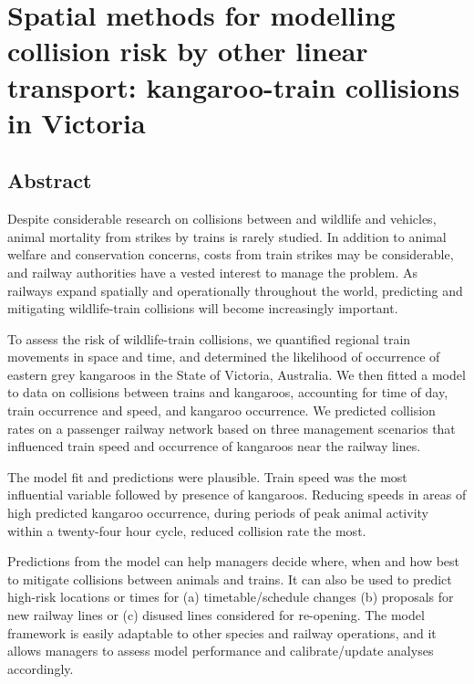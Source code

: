\chapter{Spatial methods for modelling collision risk by other linear transport: kangaroo-train collisions in Victoria}\label{sec:train}
\newpage

\begin{localsize}{10}
\section*{\centering Abstract}

Despite considerable research on collisions between and wildlife and vehicles, animal mortality from strikes by trains is rarely studied.  In addition to animal welfare and conservation concerns, costs from train strikes may be considerable, and railway authorities have a vested interest to manage the problem. As railways expand spatially and operationally throughout the world, predicting and mitigating wildlife-train collisions will become increasingly important.

To assess the risk of wildlife-train collisions, we quantified regional train movements in space and time, and determined the likelihood of occurrence of eastern grey kangaroos in the State of Victoria, Australia. We then fitted a model to data on collisions between trains and kangaroos, accounting for time of day, train occurrence and speed, and kangaroo occurrence.  We predicted collision rates on a passenger railway network based on three management scenarios that influenced train speed and occurrence of kangaroos near the railway lines.

The model fit and predictions were plausible.  Train speed was the most influential variable followed by presence of kangaroos.  Reducing speeds in areas of high predicted kangaroo occurrence, during periods of peak animal activity within a twenty-four hour cycle, reduced collision rate the most.

Predictions from the model can help managers decide where, when and how best to mitigate collisions between animals and trains.  It can also be used to predict high-risk locations or times for (a) timetable/schedule changes (b) proposals for new railway lines or (c) disused lines considered for re-opening. The model framework is easily adaptable to other species and railway operations, and it allows managers to assess model performance and calibrate/update analyses accordingly.

\end{localsize}

